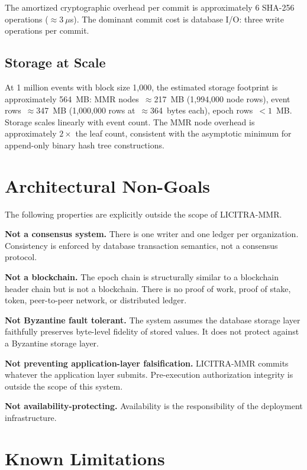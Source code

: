 \documentclass{article}
\begin{document}
The amortized cryptographic overhead per commit is approximately 6 SHA-256
operations ($\approx3~\mu$s). The dominant commit cost is database I/O: three
write operations per commit.

\subsection{Storage at Scale}

At 1 million events with block size 1,000, the estimated storage footprint is
approximately 564~MB: MMR nodes~$\approx$217~MB (1,994,000 node rows), event
rows~$\approx$347~MB (1,000,000 rows at~$\approx$364~bytes each), epoch
rows~$<1$~MB. Storage scales linearly with event count. The MMR node overhead is
approximately $2\times$ the leaf count, consistent with the asymptotic minimum
for append-only binary hash tree constructions.

\section{Architectural Non-Goals}
\label{sec:nongoals}

The following properties are explicitly outside the scope of LICITRA-MMR.

\textbf{Not a consensus system.} There is one writer and one ledger per
organization. Consistency is enforced by database transaction semantics, not a
consensus protocol.

\textbf{Not a blockchain.} The epoch chain is structurally similar to a
blockchain header chain but is not a blockchain. There is no proof of work,
proof of stake, token, peer-to-peer network, or distributed ledger.

\textbf{Not Byzantine fault tolerant.} The system assumes the database storage
layer faithfully preserves byte-level fidelity of stored values. It does not
protect against a Byzantine storage layer.

\textbf{Not preventing application-layer falsification.} LICITRA-MMR commits
whatever the application layer submits. Pre-execution authorization integrity is
outside the scope of this system.

\textbf{Not availability-protecting.} Availability is the responsibility of the
deployment infrastructure.

\section{Known Limitations}
\label{sec:limitations}
\end{document}
